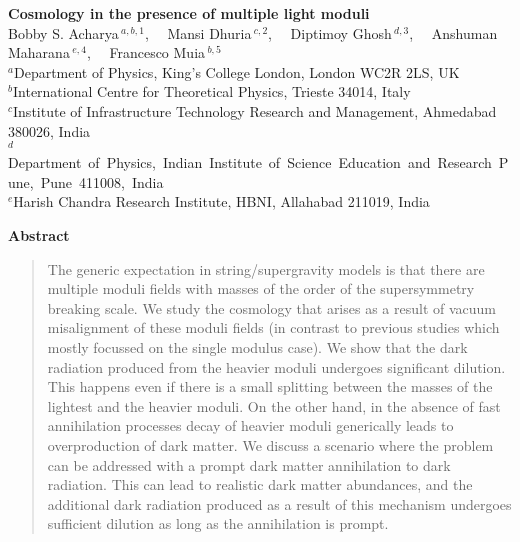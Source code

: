 \documentclass[12pt]{article}
\numberwithin{equation}{section}
\begin{document}
 
\thispagestyle{empty}
%
%
\begin{center}
\vspace*{0.5cm}
{\LARGE\bf Cosmology in the presence of multiple light moduli \\}
%
\bigskip
%
{\large  Bobby S. Acharya}\,$^{a,b,1}$, \, \, 
{\large  Mansi Dhuria}\,$^{c,2}$, \, \, 
{\large  Diptimoy Ghosh}\,$^{d,3}$, \, \, 
{\large  Anshuman Maharana}\,$^{e,4}$, \, \, 
{\large  Francesco Muia}\,$^{b,5}$ \, \,
\\
\bigskip 
\bigskip
{\small
$^a$Department of Physics, King's College London, London WC2R 2LS, UK \\[2mm]
$^b$International Centre for Theoretical Physics, Trieste 34014, Italy \\[2mm]
$^c$Institute of Infrastructure Technology Research and Management, Ahmedabad 380026, India \\[2mm]
\hspace*{-5mm} $^d$\mbox{Department of Physics, Indian Institute of Science Education and Research Pune, Pune 411008, India}\\[2mm]
$^e$Harish Chandra Research Institute, HBNI, Allahabad 211019, India
}
\end{center}
%
\bigskip 
%
\vspace*{1cm}
\begin{center} 
{\Large\bf Abstract} 
\end{center}
\vspace*{-0.35in}
\begin{quotation}
%
\noindent 
%
The generic expectation in string/supergravity models is that there are multiple moduli fields with masses of the order of the supersymmetry
breaking scale.
We study the cosmology that arises as a result of vacuum misalignment of these moduli fields (in contrast to previous studies
which mostly focussed on the single modulus case). We show that the dark radiation produced
from the heavier moduli undergoes significant dilution. This happens even if there is a small splitting between the masses of the 
lightest and the heavier moduli. On the other hand, in the absence of fast annihilation processes decay of heavier moduli generically
leads to overproduction of dark matter. We discuss a scenario where the problem can be addressed with a prompt dark matter annihilation
to dark radiation. This can lead to realistic dark matter abundances, and the additional dark radiation produced as a result of
this mechanism undergoes sufficient dilution as long as the annihilation is prompt.



%
\end{quotation}
\end{document}
